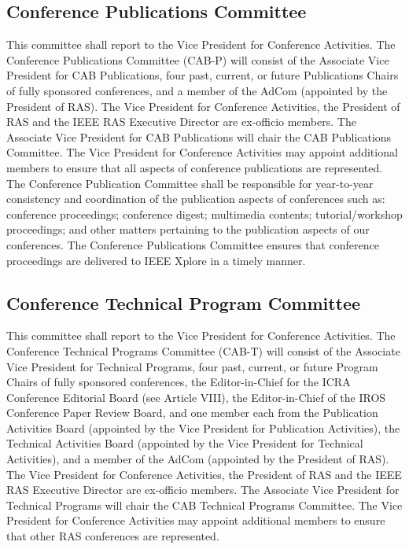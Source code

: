 \documentclass[10pt]{article}
\begin{document}
\subsection{Conference Publications Committee}

This committee shall report to the Vice President for Conference Activities. The Conference Publications Committee (CAB-P) will consist of the Associate Vice President for CAB Publications, four past, current, or future Publications Chairs of fully sponsored conferences, and a member of the AdCom (appointed by the President of RAS). The Vice President for Conference Activities, the President of RAS and the IEEE RAS Executive Director are ex-officio members. The Associate Vice President for CAB Publications will chair the CAB Publications Committee. The Vice President for Conference Activities may appoint additional members to ensure that all aspects of conference publications are represented. The Conference Publication Committee shall be responsible for year-to-year consistency and coordination of the publication aspects of conferences such as: conference proceedings; conference digest; multimedia contents; tutorial/workshop proceedings; and other matters pertaining to the publication aspects of our conferences. The Conference Publications Committee ensures that conference proceedings are delivered to IEEE Xplore in a timely manner.



\subsection{Conference Technical Program Committee}
This committee shall report to the Vice President for Conference Activities. The Conference Technical Programs Committee (CAB-T) will consist of the Associate Vice President for Technical Programs, four past, current, or future Program Chairs of fully sponsored conferences, the Editor-in-Chief for the ICRA Conference Editorial Board (see Article VIII), the Editor-in-Chief of the IROS Conference Paper Review Board, and one member each from the Publication Activities Board (appointed by the Vice President for Publication Activities), the Technical Activities Board (appointed by the Vice President for Technical Activities), and a member of the AdCom (appointed by the President of RAS).  The Vice President for Conference Activities, the President of RAS and the IEEE RAS Executive Director are ex-officio members. The Associate Vice President for Technical Programs will chair the CAB Technical Programs Committee. The Vice President for Conference Activities may appoint additional members to ensure that other RAS conferences are represented.
\end{document}
